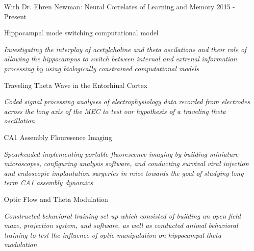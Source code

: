 \begin{cventries}

  
\cvrpentry
    {With Dr. Ehren Newman: Neural Correlates of Learning and Memory} %
    {} %
    {} %
    {2015 - Present } %
    {
      \begin{cvrpitems} %
        \item {Hippocampal mode switching computational model}
           \begin{cvitemsdes} 
	     \item{\textit{Investigating the interplay of acetylcholine and theta oscilations and their role of allowing the hippocampus to switch between internal and extrenal information processing by using biologically constrained computational models}}
           \end{cvitemsdes} 
	\item{Traveling Theta Wave in the Entorhinal Cortex}
            \begin{cvitemsdes} 
	     \item{\textit{Coded signal processing analyses of electrophysiology data recorded from electrodes across the long axis of the MEC to test our hypothesis of a traveling theta oscillation}}
           \end{cvitemsdes} 
	\item{CA1 Assembly Flouresence Imaging}
            \begin{cvitemsdes} 
	     \item{\textit{Spearheaded implementing portable fluorescence imaging by building miniature microscopes, configuring analysis software, and conducting survival viral injection and endoscopic implantation surgeries in mice towards the goal of studying long term CA1 assembly dynamics}}
           \end{cvitemsdes} 
	\item{Optic Flow and Theta Modulation}
            \begin{cvitemsdes} 
	     \item{\textit{Constructed behavioral training set up which consisted of building an open field maze, projection system, and software, as well as conducted animal behavioral training to test the influence of optic manipulation on hippocampal theta modulation}}
           \end{cvitemsdes} 
      \end{cvrpitems}
    }


\end{cventries}
